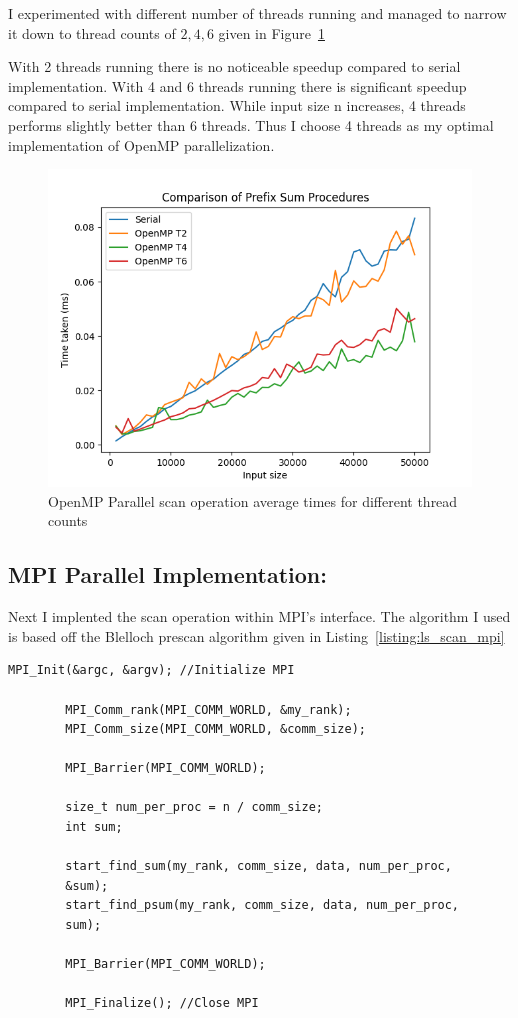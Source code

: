 	I experimented with different number of threads running and managed to narrow it down to thread counts of $2,4,6$ given in Figure~\ref{fig:fig_scan_omp_comparison}
	
	With 2 threads running there is no noticeable speedup compared to serial implementation. With 4 and 6 threads running there is significant speedup compared to serial implementation. While input size n increases, 4 threads performs slightly better than 6 threads. Thus I choose 4 threads as my optimal implementation of OpenMP parallelization.
	\begin{figure}[!htb]
		\centering
		\includegraphics[width=0.6\linewidth]{scan_omp_comparison.png}
		\caption{OpenMP Parallel scan operation average times for different thread counts}
		\label{fig:fig_scan_omp_comparison}
	\end{figure}
	
	\subsection{MPI Parallel Implementation:}
	Next I implented the scan operation within MPI's interface. The algorithm I used is based off the Blelloch\cite{Prefixsumwiki} prescan algorithm given in Listing~\ref{listing:ls_scan_mpi}
	\begin{lstlisting}[caption={MPI Parallel algorithm for computing scan operation\cite{PrefixsumMPI}.}, label={listing:ls_scan_mpi}]
		MPI_Init(&argc, &argv); //Initialize MPI
		
		MPI_Comm_rank(MPI_COMM_WORLD, &my_rank);
		MPI_Comm_size(MPI_COMM_WORLD, &comm_size);
		
		MPI_Barrier(MPI_COMM_WORLD);
		
		size_t num_per_proc = n / comm_size;
		int sum;
		
		start_find_sum(my_rank, comm_size, data, num_per_proc,
		&sum);
		start_find_psum(my_rank, comm_size, data, num_per_proc,
		sum);
		
		MPI_Barrier(MPI_COMM_WORLD);
		
		MPI_Finalize(); //Close MPI
	\end{lstlisting}
	
